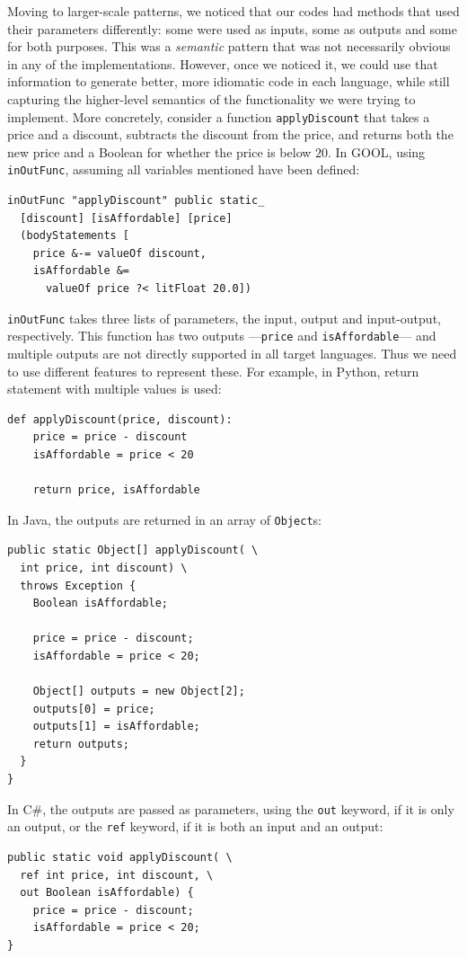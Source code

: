 \documentclass[sigplan,review,anonymous,prologue,dvipsnames]{acmart}
\newcommand{\Csharp}{C\#}
\begin{document}
Moving to larger-scale patterns, we noticed that our codes had methods that
used their parameters differently: some were used as inputs, some as outputs
and some for both purposes.  This was a \emph{semantic} pattern that was
not necessarily obvious in any of the implementations. However, once we noticed it,
we could use that information to generate better, more idiomatic code in
each language, while still capturing the higher-level semantics of the
functionality we were trying to implement.  More concretely, consider a
function \verb|applyDiscount| that takes a price and a discount, subtracts the
discount from the price, and returns both the new price and a Boolean for
whether the price is below $20$. In GOOL, using \verb|inOutFunc|, assuming
all variables mentioned have been defined:
\begin{lstlisting}
inOutFunc "applyDiscount" public static_
  [discount] [isAffordable] [price]
  (bodyStatements [
    price &-= valueOf discount,
    isAffordable &=
      valueOf price ?< litFloat 20.0])
\end{lstlisting}
\verb|inOutFunc| takes three lists of parameters, the input, output and
input-output, respectively.  This function has two outputs
---\verb|price| and \verb|isAffordable|--- and multiple outputs are
not directly supported in all target languages.  Thus we need to use
different features to represent these.  For example, in Python,
return statement with multiple values is used:
\begin{lstlisting}
def applyDiscount(price, discount):
    price = price - discount
    isAffordable = price < 20

    return price, isAffordable
\end{lstlisting}
In Java, the outputs are returned in an array of \verb|Object|s:
\begin{lstlisting}
public static Object[] applyDiscount( \
  int price, int discount) \
  throws Exception {
    Boolean isAffordable;

    price = price - discount;
    isAffordable = price < 20;

    Object[] outputs = new Object[2];
    outputs[0] = price;
    outputs[1] = isAffordable;
    return outputs;
  }
}
\end{lstlisting}
In \Csharp, the outputs are passed as parameters, using the \verb|out| keyword, if
it is only an output, or the \verb|ref| keyword, if it is both an input and an
output:
\begin{lstlisting}
public static void applyDiscount( \
  ref int price, int discount, \
  out Boolean isAffordable) {
    price = price - discount;
    isAffordable = price < 20;
}
\end{lstlisting}
\end{document}

